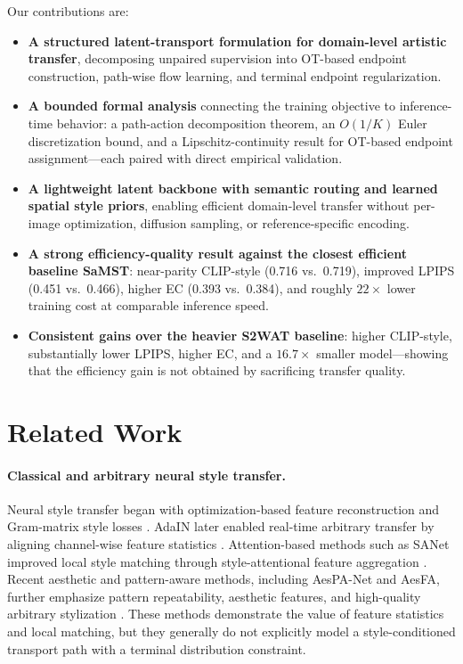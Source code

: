 ﻿\documentclass[letterpaper]{article}
\begin{document}
Our contributions are:
\begin{itemize}
    \item \textbf{A structured latent-transport formulation for domain-level artistic transfer}, decomposing unpaired supervision into OT-based endpoint construction, path-wise flow learning, and terminal endpoint regularization.
    \item \textbf{A bounded formal analysis} connecting the training objective to inference-time behavior: a path-action decomposition theorem, an $O(1/K)$ Euler discretization bound, and a Lipschitz-continuity result for OT-based endpoint assignment---each paired with direct empirical validation.
    \item \textbf{A lightweight latent backbone with semantic routing and learned spatial style priors}, enabling efficient domain-level transfer without per-image optimization, diffusion sampling, or reference-specific encoding.
    \item \textbf{A strong efficiency-quality result against the closest efficient baseline SaMST}: near-parity CLIP-style (0.716 vs.\ 0.719), improved LPIPS (0.451 vs.\ 0.466), higher EC (0.393 vs.\ 0.384), and roughly $22\times$ lower training cost at comparable inference speed.
    \item \textbf{Consistent gains over the heavier S2WAT baseline}: higher CLIP-style, substantially lower LPIPS, higher EC, and a $16.7\times$ smaller model---showing that the efficiency gain is not obtained by sacrificing transfer quality.
\end{itemize}

\section{Related Work}
\paragraph{Classical and arbitrary neural style transfer.}
Neural style transfer began with optimization-based feature reconstruction and Gram-matrix style losses \cite{gatys2016image}. AdaIN later enabled real-time arbitrary transfer by aligning channel-wise feature statistics \cite{huang2017adain}. Attention-based methods such as SANet improved local style matching through style-attentional feature aggregation \cite{park2019sanet}. Recent aesthetic and pattern-aware methods, including AesPA-Net and AesFA, further emphasize pattern repeatability, aesthetic features, and high-quality arbitrary stylization \cite{hong2023aespa,huang2024aesfa}. These methods demonstrate the value of feature statistics and local matching, but they generally do not explicitly model a style-conditioned transport path with a terminal distribution constraint.
\end{document}
